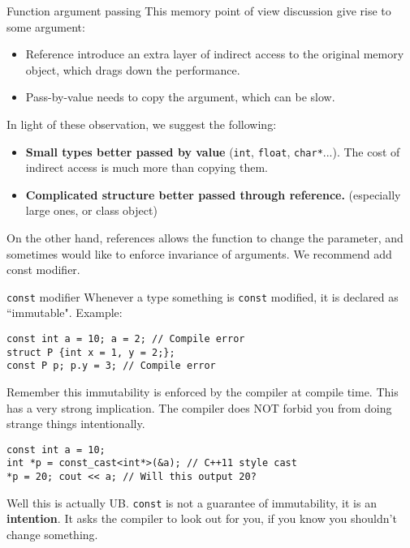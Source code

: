 \begin{frame}{Function argument passing}
This memory point of view discussion give rise to some argument:
\begin{itemize}
	\item Reference introduce an extra layer of indirect access to the original memory object, which drags down the performance.
	\item Pass-by-value needs to copy the argument, which can be slow.
\end{itemize}

In light of these observation, we suggest the following:

\begin{itemize}
	\item \textbf{Small types better passed by value} (\texttt{int}, \texttt{float}, \texttt{char*}...). The cost of indirect access is much more than copying them.
	\item \textbf{Complicated structure better passed through reference.} (especially large ones, or class object)
\end{itemize}

On the other hand, references allows the function to change the parameter, and sometimes would like to enforce invariance of arguments. We recommend add const modifier.
\end{frame}



\begin{frame}[fragile]{\texttt{const} modifier}
Whenever a type something is \texttt{const} modified, it is declared as ``immutable". Example:

\begin{verbatim}
const int a = 10; a = 2; // Compile error
struct P {int x = 1, y = 2;};
const P p; p.y = 3; // Compile error
\end{verbatim}

Remember this immutability is enforced by the compiler at compile time. This has a very strong implication. The compiler does NOT forbid you from doing strange things intentionally.

\begin{verbatim}
const int a = 10; 
int *p = const_cast<int*>(&a); // C++11 style cast
*p = 20; cout << a; // Will this output 20?
\end{verbatim}

Well this is actually UB. \texttt{const} is not a guarantee of immutability, it is an \textbf{intention}. It asks the compiler to look out for you, if you know you shouldn't change something.
\end{frame}

